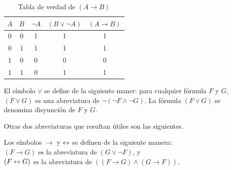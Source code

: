 \message{ !name(main.tex)}\documentclass[12pt,a4paper]{book}
\begin{document}
    \begin{table}[htbp]
        \centering
        \caption{Tabla de verdad de $(A\rightarrow B)$}
        \renewcommand{\arraystretch}{1.5}
        \setlength{\tabcolsep}{15pt}
        \begin{tabular}{c | c | c | c | c}
            $A$ & $B$ & $\neg A$ & $(B\vee\neg A)$ & $(A\rightarrow B)$ \\
            \hline
            0 & 0 & 1 & 1 & 1\\
            0 & 1 & 1 & 1 & 1\\
            1 & 0 & 0 & 0 & 0\\
            1 & 1 & 0 & 1 & 1
        \end{tabular}
    \end{table}

    \vspace{1cm}

    \begin{definicion}[Disyunción]
        El símbolo $\vee$ se define de la siguiente maner: para cualquier fórmula $F$ y $G$, $(F\vee G)$ es una abreviatura de
        $\neg(\neg F\wedge \neg G)$. La fórmula $(F\vee G)$ se denomina disyunción de $F$ y $G$.
    \end{definicion}

    Otras dos abreviaturas que resultan útiles son las siguientes.

    \begin{definicion}
        Los símbolos $\rightarrow$ y $\leftrightarrow$ se definen de la siguiente manera:\\
        $(F\rightarrow G)$ es la abreviatura de $(G\vee\neg F)$, y\\
        $(F\leftrightarrow G)$ es la abreviatura de $((F\rightarrow G)\wedge(G\rightarrow F))$.
    \end{definicion}
\end{document}
